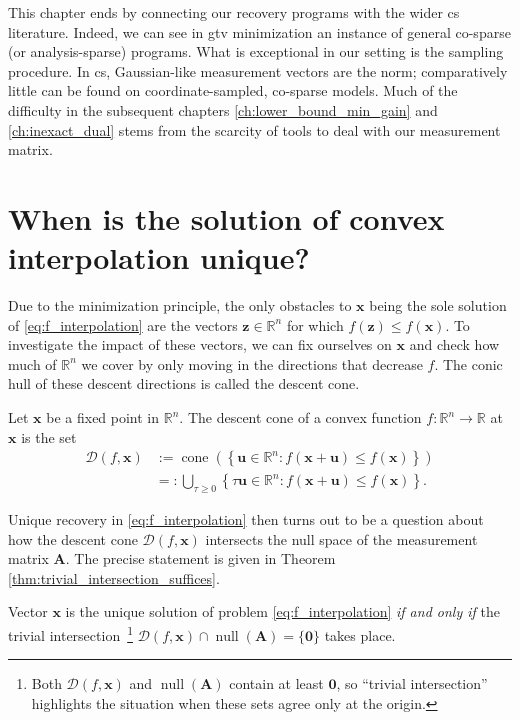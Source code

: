 This chapter ends by connecting our recovery programs with the wider \acrlong{cs} literature. Indeed, we can see in \acrshort{gtv} minimization an instance of general co-sparse (or analysis-sparse) programs. What is exceptional in our setting is the sampling procedure. In \acrshort{cs}, Gaussian-like measurement vectors are the norm; comparatively little can be found on coordinate-sampled, co-sparse models. Much of the difficulty in the subsequent chapters \ref{ch:lower_bound_min_gain} and \ref{ch:inexact_dual} stems from the scarcity of tools to deal with our measurement matrix.


\section{When is the solution of convex interpolation unique?}

Due to the minimization principle, the only obstacles to $\mathbf{x}$ being the sole solution of \eqref{eq:f_interpolation} are the vectors $\mathbf{z} \in \mathbb{R}^{n}$ for which $f(\mathbf{z}) \leq f(\mathbf{x})$. To investigate the impact of these vectors, we can fix ourselves on $\mathbf{x}$ and check how much of $\mathbb{R}^{n}$ we cover by only moving in the directions that decrease $f$. The conic hull of these descent directions is called the descent cone.

\begin{definition}
    Let $\mathbf{x}$ be a fixed point in $\mathbb{R}^{n}$. The descent cone of a convex function $f: \mathbb{R}^{n} \to \mathbb{R}$ at $\mathbf{x}$ is the set
    \begin{align}
        \mathcal{D}(f, \mathbf{x}) & := \operatorname{cone} \left ( \left\{ \mathbf{u} \in \mathbb{R}^{n} : f(\mathbf{x} + \mathbf{u}) \leq f(\mathbf{x}) \right\} \right ) \\
        & =: \bigcup_{\tau \geq 0} \left\{ \tau \mathbf{u} \in \mathbb{R}^{n} : f(\mathbf{x} + \mathbf{u}) \leq f(\mathbf{x}) \right\} .
    \end{align}
\end{definition}

Unique recovery in \eqref{eq:f_interpolation} then turns out to be a question about how the descent cone $\mathcal{D}(f, \mathbf{x})$ intersects the null space of the measurement matrix $\mathbf{A}$. The precise statement is given in Theorem \ref{thm:trivial_intersection_suffices}.

\begin{theorem}\label{thm:trivial_intersection_suffices}
    Vector $\mathbf{x}$ is the unique solution of problem \eqref{eq:f_interpolation} \emph{if and only if} the trivial intersection~\footnote{Both $\mathcal{D}(f, \mathbf{x})$ and $\operatorname{null} \left ( \mathbf{A} \right )$ contain at least $\mathbf{0}$, so ``trivial intersection'' highlights the situation when these sets agree only at the origin.} $\mathcal{D}(f, \mathbf{x}) \cap \operatorname{null} \left ( \mathbf{A} \right ) = \{ \mathbf{0} \}$ takes place.
\end{theorem}

